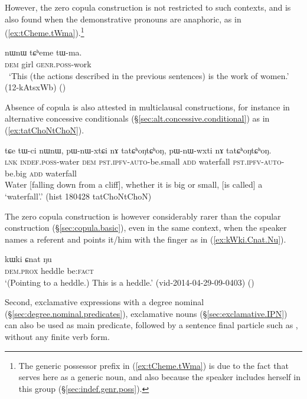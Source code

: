 However, the zero copula construction is not restricted to such contexts, and is also found when the demonstrative pronouns are anaphoric, as in (\ref{ex:tCheme.tWma}).\footnote{The generic possessor prefix in (\ref{ex:tCheme.tWma}) is due to the fact that  serves here as a generic noun, and also because the speaker includes herself in this group (§\ref{sec:indef.genr.poss}). }

\begin{exe}
\ex \label{ex:tCheme.tWma}
\gll nɯnɯ tɕʰeme tɯ-ma. \\
\textsc{dem} girl \textsc{genr}.\textsc{poss}-work \\
\glt  `This (the actions described in the previous sentences) is the work of women.' (12-kAtsxWb)
()
\end{exe}

Absence of copula is also attested in multiclausal constructions, for instance in alternative concessive conditionals (§\ref{sec:alt.concessive.conditional}) as in (\ref{ex:tatChoNtChoN}).

\begin{exe}
	\ex \label{ex:tatChoNtChoN}
	\gll tɕe tɯ-ci nɯnɯ, pɯ-nɯ-xtɕi nɤ tatɕʰoŋtɕʰoŋ, pɯ-nɯ-wxti nɤ tatɕʰoŋtɕʰoŋ. \\
	\textsc{lnk} \textsc{indef}.\textsc{poss}-water \textsc{dem} \textsc{pst}.\textsc{ipfv}-\textsc{auto}-be.small \textsc{add} waterfall \textsc{pst}.\textsc{ipfv}-\textsc{auto}-be.big \textsc{add} waterfall \\
	\glt Water [falling down from a cliff], whether it is big or small, [is called] a `waterfall'.' 	(hist 180428 tatChoNtChoN)
\end{exe}


The zero copula construction is however considerably rarer than the copular construction (§\ref{sec:copula.basic}), even in the same context, when the speaker names a referent and points it/him with the finger as in (\ref{ex:kWki.Cnat.Nu}).

\begin{exe}
\ex \label{ex:kWki.Cnat.Nu}
\gll  kɯki ɕnat ŋu \\
\textsc{dem}.\textsc{prox} heddle be:\textsc{fact} \\
\glt  `(Pointing to a heddle.) This is a heddle.' (vid-2014-04-29-09-0403)
()
\end{exe}

Second, exclamative expressions with a degree nominal (§\ref{sec:degree.nominal.predicates}), exclamative nouns (§\ref{sec:exclamative.IPN}) can also be used as main predicate, followed by a sentence final particle such as , without any finite verb form.

